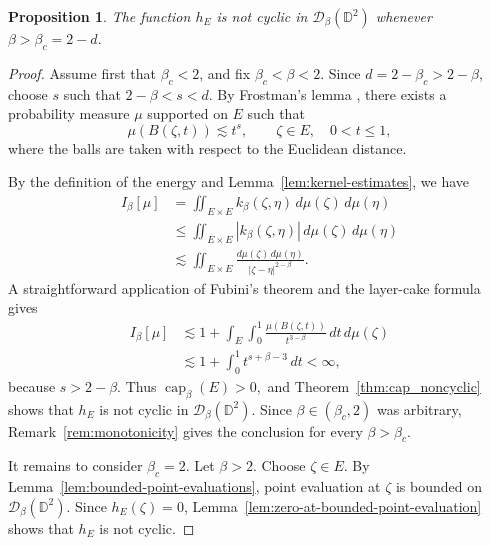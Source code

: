 \documentclass[a4paper,12pt]{amsart}
\newtheorem{prop}[thm]{Proposition}
\theoremstyle{definition}
\begin{document}
\begin{prop}\label{prop:case2-noncyclicity}
The function $h_E$ is not cyclic in $\mathcal D_\beta(\mathbb D^2)$ whenever
$ \beta>\beta_c=2-d.$
\end{prop}

\begin{proof}
Assume first that $\beta_c<2$, and fix
$\beta_c<\beta<2.$
Since $d=2-\beta_c>2-\beta$, choose $s$ such that
$
    2-\beta<s<d.
$
By Frostman's lemma
\cite[Theorem~8.9]{Mattila1995}, there exists a probability measure $\mu$
supported on $E$ such that
\[
    \mu(B(\zeta,t))\lesssim t^s,
    \qquad \zeta\in E,\quad 0<t\leq1,
\]
where the balls are taken with respect to the Euclidean distance.

By the definition of the energy and
Lemma~\ref{lem:kernel-estimates}, we have
\[
\begin{aligned}
    I_\beta[\mu]
    &=
    \iint_{E\times E}
    k_\beta(\zeta,\eta)\,
    d\mu(\zeta)\,d\mu(\eta)
     \\
    &\leq
    \iint_{E\times E}
    |k_\beta(\zeta,\eta)|\,
    d\mu(\zeta)\,d\mu(\eta) \\
    &\lesssim
    \iint_{E\times E}
    \frac{d\mu(\zeta)\,d\mu(\eta)}
         {|\zeta-\eta|^{2-\beta}}.
\end{aligned}
\]
A straightforward application of Fubini's theorem and the layer-cake formula
\cite[p.~26]{LiebLoss} gives
\[
\begin{aligned}
    I_\beta[\mu]
    &\lesssim
    1+\int_E\int_0^1
    \frac{\mu(B(\zeta,t))}{t^{3-\beta}}\,
    dt\,d\mu(\zeta) \\
    &\lesssim
    1+\int_0^1t^{s+\beta-3}\,dt
    <\infty,
\end{aligned}
\]
because $s>2-\beta$. Thus
$\operatorname{cap}_\beta(E)>0,
$
and Theorem~\ref{thm:cap_noncyclic} shows that $h_E$ is not cyclic in
$\mathcal D_\beta(\mathbb D^2)$. Since $\beta\in(\beta_c,2)$ was arbitrary,
Remark~\ref{rem:monotonicity} gives the conclusion for every
$\beta>\beta_c$.

It remains to consider $\beta_c=2$. Let $\beta>2$. Choose $\zeta\in E$. By
Lemma~\ref{lem:bounded-point-evaluations}, point evaluation at
$\zeta$ is bounded on $\mathcal D_\beta(\mathbb D^2)$. Since $h_E(\zeta)=0$,
Lemma~\ref{lem:zero-at-bounded-point-evaluation} shows that $h_E$ is not
cyclic.
\end{proof}
\end{document}
